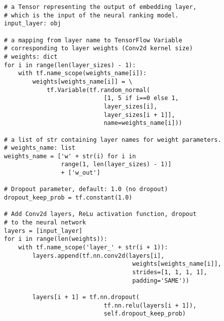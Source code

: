 \begin{verbatim}
# a Tensor representing the output of embedding layer, 
# which is the input of the neural ranking model.
input_layer: obj

# a mapping from layer name to TensorFlow Variable 
# corresponding to layer weights (Conv2d kernel size)
# weights: dict 
for i in range(len(layer_sizes) - 1):
    with tf.name_scope(weights_name[i]):
        weights[weights_name[i]] = \
            tf.Variable(tf.random_normal(
                            [1, 5 if i==0 else 1, 
                            layer_sizes[i], 
                            layer_sizes[i + 1]],
                            name=weights_name[i]))

# a list of str containing layer names for weight parameters.
# weights_name: list
weights_name = ['w' + str(i) for i in 
                range(1, len(layer_sizes) - 1)] 
                + ['w_out']

# Dropout parameter, default: 1.0 (no dropout)
dropout_keep_prob = tf.constant(1.0)

# Add Conv2d layers, ReLu activation function, dropout
# to the neural network
layers = [input_layer]
for i in range(len(weights)):
    with tf.name_scope('layer_' + str(i + 1)):
        layers.append(tf.nn.conv2d(layers[i],
                                    weights[weights_name[i]],
                                    strides=[1, 1, 1, 1],
                                    padding='SAME'))
        
        layers[i + 1] = tf.nn.dropout(
                            tf.nn.relu(layers[i + 1]),
                            self.dropout_keep_prob)
\end{verbatim}


